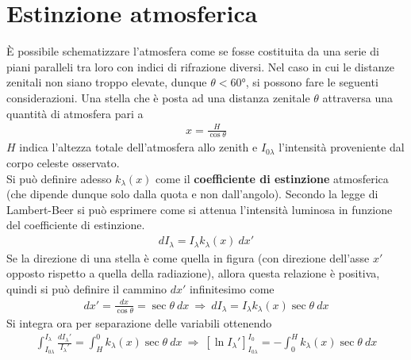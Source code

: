 \documentclass[a4paper, oneside]{book}
\begin{document}
\section{Estinzione atmosferica}
\begin{figure}
    \centering
\end{figure}
È possibile schematizzare l'atmosfera come se fosse costituita da una serie
di piani paralleli tra loro con indici di rifrazione diversi. Nel caso in cui le distanze
zenitali non siano troppo elevate, dunque $\theta < 60$°, si possono fare le seguenti considerazioni. 
Una stella che è posta ad una distanza zenitale $\theta$ attraversa una quantità di 
atmosfera pari a
\begin{align}
    x = \frac{H}{\cos\theta}
\end{align}
$H$ indica l'altezza totale dell'atmosfera allo zenith e $I_{0\lambda}$ l'intensità proveniente dal corpo 
celeste osservato.   \\ \noindent
Si può definire adesso $k_\lambda(x)$ come il \textbf{coefficiente di estinzione} atmosferica (che dipende dunque
solo dalla quota e non dall'angolo). Secondo la legge di Lambert-Beer si può esprimere come 
si attenua l'intensità luminosa in funzione del coefficiente di estinzione. 
\begin{align}
    dI_\lambda = I_\lambda k_\lambda(x) \ dx'
\end{align}
Se la direzione di una stella è come quella in figura (con direzione dell'asse $x'$
opposto rispetto a quella della radiazione), allora questa relazione 
è positiva, quindi si può definire il cammino
$dx'$ infinitesimo come
\begin{gather*}
    dx' = \frac{dx}{\cos \theta} = \sec \theta \ dx \ \Longrightarrow \ dI_\lambda = I_\lambda k_\lambda(x) \sec\theta \ dx 
\end{gather*}
Si integra ora per separazione delle variabili ottenendo 
\begin{gather*}
    \int_{I_{0\lambda}}^{I_\lambda} \frac{dI_\lambda '}{I_\lambda'} = \int_{H}^{0} k_\lambda(x) \sec\theta \ dx \ \Longrightarrow \ \left[\ln I_\lambda'\right]^{I_0}_{I_{0\lambda}}  = - \int_{0}^{H}k_\lambda (x) \sec \theta \ dx 
\end{gather*}
\end{document}
